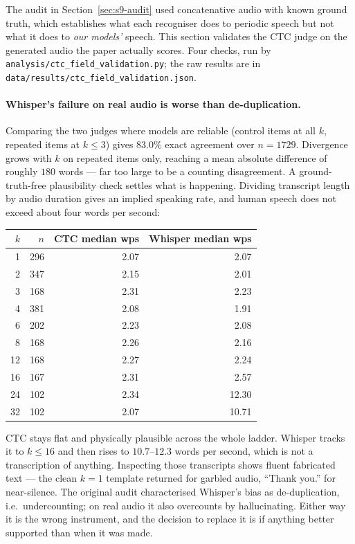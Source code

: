 \documentclass[11pt]{article}
\begin{document}
The audit in Section~\ref{sec:s9-audit} used concatenative audio with known
ground truth, which establishes what each recogniser does to periodic speech but
not what it does to \emph{our models'} speech. This section validates the CTC
judge on the generated audio the paper actually scores. Four checks, run by
\texttt{analysis/ctc\_field\_validation.py}; the raw results are in
\texttt{data/results/ctc\_field\_validation.json}.

\paragraph{Whisper's failure on real audio is worse than de-duplication.}
Comparing the two judges where models are reliable (control items at all $k$,
repeated items at $k\le3$) gives 83.0\% exact agreement over $n=1729$. Divergence
grows with $k$ on repeated items only, reaching a mean absolute difference of
roughly $180$ words --- far too large to be a counting disagreement. A
ground-truth-free plausibility check settles what is happening. Dividing
transcript length by audio duration gives an implied speaking rate, and human
speech does not exceed about four words per second:

\begin{center}
\begin{tabular}{rrrr}
\toprule
$k$ & $n$ & CTC median wps & Whisper median wps \\
\midrule
1 & 296 & 2.07 & 2.07 \\
2 & 347 & 2.15 & 2.01 \\
3 & 168 & 2.31 & 2.23 \\
4 & 381 & 2.08 & 1.91 \\
6 & 202 & 2.23 & 2.08 \\
8 & 168 & 2.26 & 2.16 \\
12 & 168 & 2.27 & 2.24 \\
16 & 167 & 2.31 & 2.57 \\
24 & 102 & 2.34 & 12.30 \\
32 & 102 & 2.07 & 10.71 \\
\bottomrule
\end{tabular}
\end{center}

\noindent CTC stays flat and physically plausible across the whole ladder.
Whisper tracks it to $k\le16$ and then rises to $10.7$--$12.3$ words per second,
which is not a transcription of anything. Inspecting those transcripts shows
fluent fabricated text --- the clean $k\!=\!1$ template returned for garbled
audio, ``Thank you.'' for near-silence. The original audit characterised
Whisper's bias as de-duplication, i.e.\ undercounting; on real audio it also
overcounts by hallucinating. Either way it is the wrong instrument, and the
decision to replace it is if anything better supported than when it was made.
\end{document}
